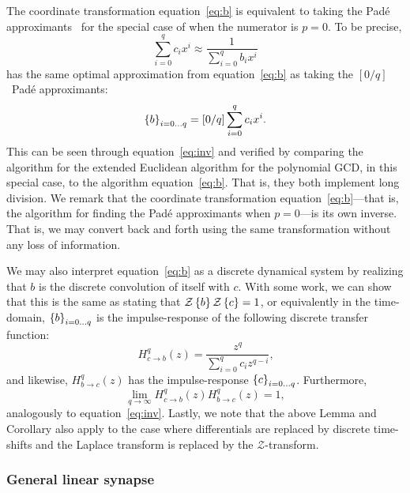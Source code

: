 The coordinate transformation equation~\ref{eq:b} is equivalent to taking the Pad\'e approximants~\citep{Pade1892} for the special case of when the numerator is $p = 0$.
To be precise,
$$
\sum_{i=0}^{q} c_i x^i \approx \frac{1}{\sum_{i=0}^q b_i x^i}
$$
has the same optimal approximation from equation~\ref{eq:b} as taking the $[0/q]$~Pad\'e approximants:
$$
\left\{ b \right\}_{i=0 \ldots q} = \left[ 0 / q \right] \sum_{i=0}^{q} c_i x^i \text{.}
$$
This can be seen through equation~\ref{eq:inv} and verified by comparing the algorithm for the extended Euclidean algorithm for the polynomial GCD, in this special case, to the algorithm equation~\ref{eq:b}. That is, they both implement long division.
We remark that the coordinate transformation equation~\ref{eq:b}---that is, the algorithm for finding the Pad\'e approximants when $p = 0$---is its own inverse. That is, we may convert back and forth using the same transformation without any loss of information.

We may also interpret equation~\ref{eq:b} as a discrete dynamical system by realizing that $b$ is the discrete convolution of itself with $c$. With some work, we can show that this is the same as stating that $\mathcal{Z} \left\{ b \right\}\mathcal{Z} \left\{ c \right\} = 1$, or equivalently in the time-domain, $\left\{ b \right\}_{i=0\ldots q}$ is the impulse-response of the following discrete transfer function:
$$
H^q_{c \rightarrow b}(z) = \frac{z^{q}}{\sum_{i=0}^q c_i z^{q - i}} \text{,}
$$
and likewise, $H^q_{b \rightarrow c}(z)$ has the impulse-response $\left\{ c \right\}_{i=0\ldots q}$.
Furthermore, $$\lim_{q \rightarrow \infty} H^q_{c \rightarrow b}(z) H^q_{b \rightarrow c}(z) = 1,$$ analogously to equation~\ref{eq:inv}.
Lastly, we note that the above Lemma and Corollary also apply to the case where differentials are replaced by discrete time-shifts and the Laplace transform is replaced by the $\mathcal{Z}$-transform.

\subsubsection{General linear synapse}

